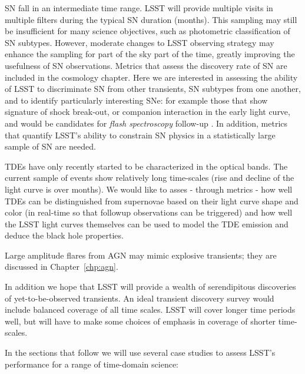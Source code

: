 SN fall in an intermediate time range.  LSST will provide
multiple visits in multiple filters during the typical SN duration
(months).  This sampling may still be insufficient for many science
objectives, such as photometric classification of SN subtypes.
However, moderate changes to LSST
observing strategy may enhance the sampling for part of the sky part
of the time, greatly improving the usefulness of SN observations.
Metrics that assess the discovery rate of SN are included in the
cosmology chapter. Here we are interested in assessing the ability of
LSST to discriminate SN from other transients, SN subtypes from one
another, and to identify particularly interesting SNe: for example
those that show signature of shock break-out, or companion interaction
in the early light curve, and would be candidates for \emph{flash
spectroscopy} follow-up \citep[e.g.,][]{2014Natur.509..471G}.
In addition, metrics that
quantify LSST's ability to constrain SN physics in a statistically
large sample of SN are needed.

TDEs have only recently started to be characterized in the optical
bands. The current sample of events show relatively long
time-scales (rise and decline of the light curve is over months). We
would like to asses - through metrics - how well TDEs can be
distinguished from supernovae based on their light curve shape and
color (in real-time so that followup observations can be triggered)
and how well the LSST light curves themselves can be used to model the
TDE emission and deduce the black hole properties.

Large amplitude flares from AGN may mimic
explosive transients; they are discussed in Chapter~\ref{chp:agn}.

In addition we hope that LSST will provide a wealth of serendipitous
discoveries of yet-to-be-observed transients.  An ideal transient
discovery survey would include balanced coverage of all time scales. LSST
will cover longer time periods well, but will have to make some
choices of emphasis in coverage of shorter time-scales.

In the sections that follow we will use several case studies to assess
LSST's performance for a range of time-domain science:

